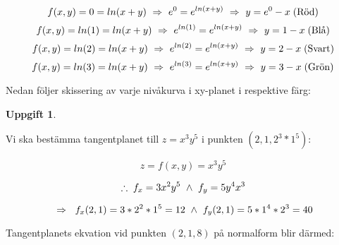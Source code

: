 \documentclass{article}
\newtheorem{thr}{Uppgift}
\begin{document}
\begin{enumerate}
        $$
        f(x, y)=0=ln(x+y) \ \Rightarrow \  e^0=e^{ln(x+y)} \ \Rightarrow \  y=e^0-x \; \text{(Röd)}
        $$
        $$
        f(x, y)=ln(1)=ln(x+y) \ \Rightarrow \  e^{ln(1)}=e^{ln(x+y)} \ \Rightarrow \  y=1-x \; \text{(Blå)}
        $$
        $$
        f(x, y)=ln(2)=ln(x+y) \ \Rightarrow \  e^{ln(2)}=e^{ln(x+y)} \ \Rightarrow \  y=2-x \; \text{(Svart)}
        $$
        $$
        f(x, y)=ln(3)=ln(x+y) \ \Rightarrow \  e^{ln(3)}=e^{ln(x+y)} \ \Rightarrow \  y=3-x \; \text{(Grön)}
        $$

        \vskip 0.3cm

        Nedan följer skissering av varje nivåkurva i xy-planet i respektive färg:

        \newpage

        \begin{figure}[h]
            \center
        \end{figure}
\end{enumerate}

\newpage

\begin{thr}
\end{thr}

Vi ska bestämma tangentplanet till $z=x^3y^5$ i punkten $(2, 1, 2^3*1^5)$:

$$
z=f(x, y)=x^3y^5
$$

$$
\therefore\; f_{x}=3x^2y^5 \ \wedge \  f_{y}=5y^4x^3
$$

$$
\ \Rightarrow \ \;
f_{x}(2, 1)=3*2^2*1^5=12 
\ \wedge \ 
f_{y}(2, 1)=5*1^4*2^3=40
$$

\vskip 0.2cm

Tangentplanets ekvation vid punkten $(2, 1, 8)$ på normalform blir därmed:
\end{document}
